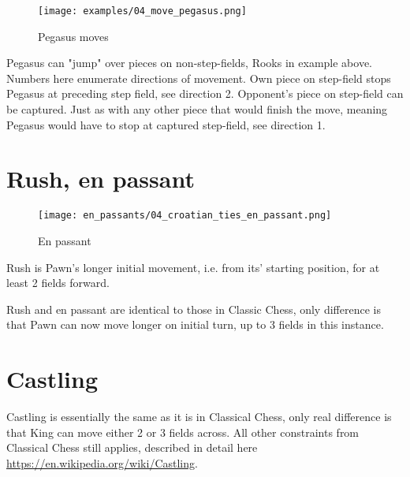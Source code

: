 \noindent
\begin{figure}[!h]
\vspace{-1.2\baselineskip}
\texttt{[image: examples/04\_move\_pegasus.png]}
\caption{Pegasus moves}
\label{fig:04_move_pegasus}
\end{figure}

Pegasus can "jump" over pieces on non-step-fields, Rooks in example above. Numbers
here enumerate directions of movement. Own piece on step-field stops Pegasus at
preceding step field, see direction 2. Opponent's piece on step-field can be captured.
Just as with any other piece that would finish the move, meaning Pegasus would have to
stop at captured step-field, see direction 1.

\clearpage %

\section*{Rush, en passant}

\noindent
\begin{wrapfigure}{l}{0.4\textwidth}
\centering
\texttt{[image: en\_passants/04\_croatian\_ties\_en\_passant.png]}
\caption{En passant}
\label{fig:04_croatian_ties_en_passant}
\end{wrapfigure}
Rush is Pawn’s longer initial movement, i.e. from its’ starting position, for at least
2 fields forward.

Rush and en passant are identical to those in Classic Chess, only difference is that Pawn
can now move longer on initial turn, up to 3 fields in this instance.

\clearpage %

\section*{Castling}

Castling is essentially the same as it is in Classical Chess, only real difference is that
King can move either 2 or 3 fields across. All other constraints from Classical Chess still
applies, described in detail here \\
\href{https://en.wikipedia.org/wiki/Castling}{https://en.wikipedia.org/wiki/Castling}.

